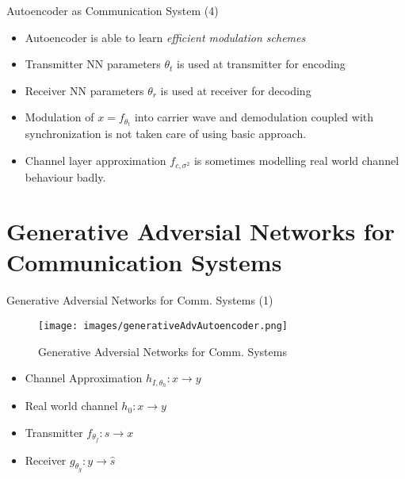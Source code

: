\documentclass[xcolor=table,mathserif,9pt]{beamer}    %
\begin{document}
\begin{frame}{Autoencoder as Communication System (4)}

	\begin{itemize}
		\item Autoencoder is able to learn \emph{efficient modulation schemes}
	\end{itemize}
	\vspace{1em}

\begin{figure}
  \centering
	\qquad
\end{figure}

\begin{itemize}
	\item Transmitter NN parameters $\theta_t$ is used at transmitter for encoding
	\item Receiver NN parameters $\theta_r$ is used at receiver for decoding
	\item Modulation of $x = f_{\theta_t}$ into carrier wave and demodulation coupled with synchronization is not taken care of 
	      using basic approach.	
	\item Channel layer approximation $f_{c, \sigma^2}$ is sometimes modelling real world channel behaviour badly.
\end{itemize}


\end{frame}

\section{Generative Adversial Networks for Communication Systems}
\begin{frame}{Generative Adversial Networks for Comm. Systems (1)}

\begin{figure}[htpb]
	\centering
	\texttt{[image: images/generativeAdvAutoencoder.png]}
	\caption{Generative Adversial Networks for Comm. Systems \cite{2018arXiv180303145O}}
\end{figure}

\begin{itemize}
	\item Channel Approximation $h_{I, \theta_h}: x \to y$ 
	\item Real world channel $h_0: x \to y$
	\item Transmitter $f_{\theta_f}: s \to x $
	\item Receiver $g_{\theta_g}: y \to \hat{s}$
\end{itemize}

\end{frame}
\end{document}
